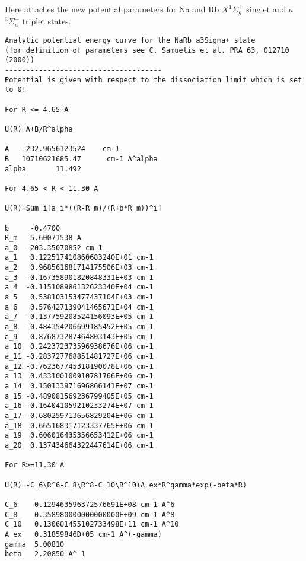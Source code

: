Here attaches the new potential parameters for Na and Rb $X^1\Sigma_g^+$ singlet and $a$ $^3\Sigma_u^+$ triplet states.
\linespread{1.0}
\begin{lstlisting}
Analytic potential energy curve for the NaRb a3Sigma+ state
(for definition of parameters see C. Samuelis et al. PRA 63, 012710 (2000)) 
-------------------------------------
Potential is given with respect to the dissociation limit which is set to 0!

For R <= 4.65 A

U(R)=A+B/R^alpha

A	-232.9656123524    cm-1
B	10710621685.47      cm-1 A^alpha 
alpha       11.492

For 4.65 < R < 11.30 A

U(R)=Sum_i[a_i*((R-R_m)/(R+b*R_m))^i]

b     -0.4700
R_m   5.60071538 A 
a_0  -203.35070852 cm-1
a_1   0.122517410860683240E+01 cm-1
a_2   0.968561681714175506E+03 cm-1
a_3  -0.167358901820848331E+03 cm-1
a_4  -0.115108986132623340E+04 cm-1 
a_5   0.538103153477437104E+03 cm-1
a_6   0.576427139041465671E+04 cm-1
a_7  -0.137759208524156093E+05 cm-1
a_8  -0.484354206699185452E+05 cm-1
a_9   0.876873287464803143E+05 cm-1
a_10  0.242372373596938676E+06 cm-1
a_11 -0.283727768851481727E+06 cm-1
a_12 -0.762367745318190078E+06 cm-1
a_13  0.433100100910781766E+06 cm-1
a_14  0.150133971696866141E+07 cm-1
a_15 -0.489081569236799405E+05 cm-1
a_16 -0.164041059210233274E+07 cm-1
a_17 -0.680259713656829204E+06 cm-1
a_18  0.665168317123337765E+06 cm-1
a_19  0.606016435356653412E+06 cm-1
a_20  0.137434664322447614E+06 cm-1
  
For R>=11.30 A

U(R)=-C_6\R^6-C_8\R^8-C_10\R^10+A_ex*R^gamma*exp(-beta*R)

C_6    0.129463596372576691E+08 cm-1 A^6
C_8    0.358980000000000000E+09 cm-1 A^8
C_10   0.130601455102733498E+11 cm-1 A^10
A_ex   0.31859846D+05 cm-1 A^(-gamma)
gamma  5.00810   
beta   2.20850 A^-1


\end{lstlisting}
